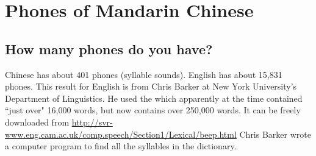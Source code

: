 ﻿%

\chapter{Phones of Mandarin Chinese}
\label{chp:phones}
\section{How many phones do you have?}
Chinese has about {401} phones (syllable sounds).
English has about {15,831} phones.
This result for English is from Chris Barker at 
  New York University's Department of Linguistics.
      He used the 
             which apparently at the time contained ``just over" 16,000 words, but now 
             contains over 250,000 words. It can be freely downloaded from
             \url{http://svr-www.eng.cam.ac.uk/comp.speech/Section1/Lexical/beep.html}
      Chris Barker wrote a computer program to find all the syllables in the dictionary. 



